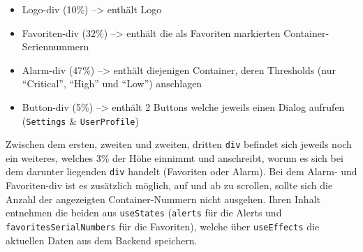 \documentclass[
    headings=optiontotocandhead,%
    twoside,
    numbers=noenddot,%
    12pt, %
    titlepage, %
    parskip=full, %
    listof=leveldown, 
    numbers=noenddot, %
    a4paper,DIV=14,
    BCOR=15mm,
]{scrbook}
\newcommand{\passthrough}[1]{#1}
\providecommand{\tightlist}{%
  \setlength{\itemsep}{0pt}\setlength{\parskip}{0pt}}
\begin{document}
\begin{itemize}
\tightlist
\item
  Logo-div (10\%) --\textgreater{} enthält Logo
\item
  Favoriten-div (32\%) --\textgreater{} enthält die als Favoriten
  markierten Container-Seriennummern
\item
  Alarm-div (47\%) --\textgreater{} enthält diejenigen Container, deren
  Thresholds (nur ``Critical'', ``High'' und ``Low'') anschlagen
\item
  Button-div (5\%) --\textgreater{} enthält 2 Buttons welche jeweils
  einen Dialog aufrufen (\passthrough{\lstinline!Settings!} \&
  \passthrough{\lstinline!UserProfile!})
\end{itemize}

Zwischen dem ersten, zweiten und zweiten, dritten
\passthrough{\lstinline!div!} befindet sich jeweils noch ein weiteres,
welches 3\% der Höhe einnimmt und anschreibt, worum es sich bei dem
darunter liegenden \passthrough{\lstinline!div!} handelt (Favoriten oder
Alarm). Bei dem Alarm- und Favoriten-div ist es zusätzlich möglich, auf
und ab zu scrollen, sollte sich die Anzahl der angezeigten
Container-Nummern nicht ausgehen. Ihren Inhalt entnehmen die beiden aus
\passthrough{\lstinline!useStates!} (\passthrough{\lstinline!alerts!}
für die Alerts und \passthrough{\lstinline!favoritesSerialNumbers!} für
die Favoriten), welche über \passthrough{\lstinline!useEffects!} die
aktuellen Daten aus dem Backend speichern.
\end{document}
